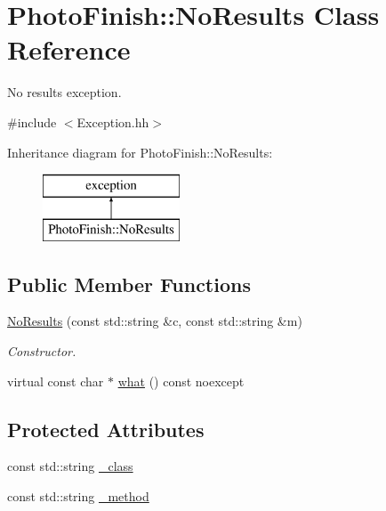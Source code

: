 \hypertarget{class_photo_finish_1_1_no_results}{}\section{Photo\+Finish\+:\+:No\+Results Class Reference}
\label{class_photo_finish_1_1_no_results}


No results exception.  




{\ttfamily \#include $<$Exception.\+hh$>$}

Inheritance diagram for Photo\+Finish\+:\+:No\+Results\+:\begin{figure}[H]
\begin{center}
\leavevmode
\includegraphics[height=2.000000cm]{class_photo_finish_1_1_no_results}
\end{center}
\end{figure}
\subsection*{Public Member Functions}
\begin{DoxyCompactItemize}
\item 
\hyperlink{class_photo_finish_1_1_no_results_ac6abdb646f26fd45755bbf2e75a9136d}{No\+Results} (const std\+::string \&c, const std\+::string \&m)
\begin{DoxyCompactList}\small\item\em Constructor. \end{DoxyCompactList}\item 
virtual const char $\ast$ \hyperlink{class_photo_finish_1_1_no_results_a60f0f1cdad7e5b8eab478e03cc537270}{what} () const noexcept
\end{DoxyCompactItemize}
\subsection*{Protected Attributes}
\begin{DoxyCompactItemize}
\item 
const std\+::string \hyperlink{class_photo_finish_1_1_no_results_aff976ddae0700b53d38853d317ad4625}{\+\_\+class}
\item 
const std\+::string \hyperlink{class_photo_finish_1_1_no_results_a40b03fc0845bb24d48f3c262cac6db25}{\+\_\+method}
\end{DoxyCompactItemize}


